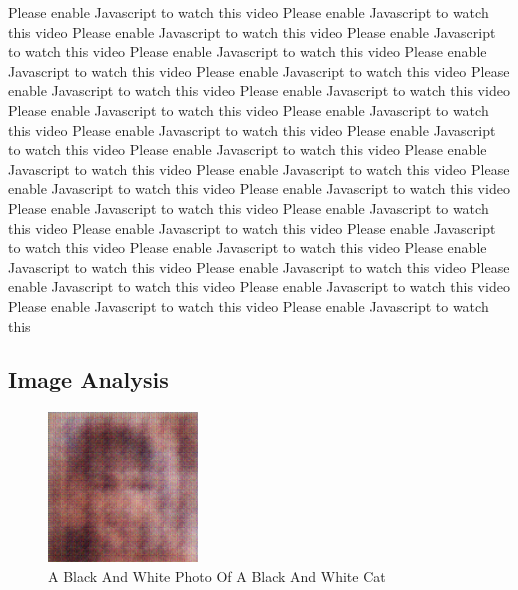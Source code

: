 \documentclass{article}%
\begin{document}
Please enable Javascript to watch this video\newline%
Please enable Javascript to watch this video\newline%
Please enable Javascript to watch this video\newline%
Please enable Javascript to watch this video\newline%
Please enable Javascript to watch this video\newline%
Please enable Javascript to watch this video\newline%
Please enable Javascript to watch this video\newline%
Please enable Javascript to watch this video\newline%
Please enable Javascript to watch this video\newline%
Please enable Javascript to watch this video\newline%
Please enable Javascript to watch this video\newline%
Please enable Javascript to watch this video\newline%
Please enable Javascript to watch this video\newline%
Please enable Javascript to watch this video\newline%
Please enable Javascript to watch this video\newline%
Please enable Javascript to watch this video\newline%
Please enable Javascript to watch this video\newline%
Please enable Javascript to watch this video\newline%
Please enable Javascript to watch this video\newline%
Please enable Javascript to watch this video\newline%
Please enable Javascript to watch this video\newline%
Please enable Javascript to watch this video\newline%
Please enable Javascript to watch this video\newline%
Please enable Javascript to watch this video\newline%
Please enable Javascript to watch this video\newline%
Please enable Javascript to watch this video\newline%
Please enable Javascript to watch this video\newline%
Please enable Javascript to watch this video\newline%
Please enable Javascript to watch this

%
\subsection{Image Analysis}%
\label{subsec:ImageAnalysis}%


\begin{figure}[h!]%
\centering%
\includegraphics[width=150px]{500_fake_images/samples_5_53.png}%
\caption{A Black And White Photo Of A Black And White Cat}%
\end{figure}

%
\end{document}
